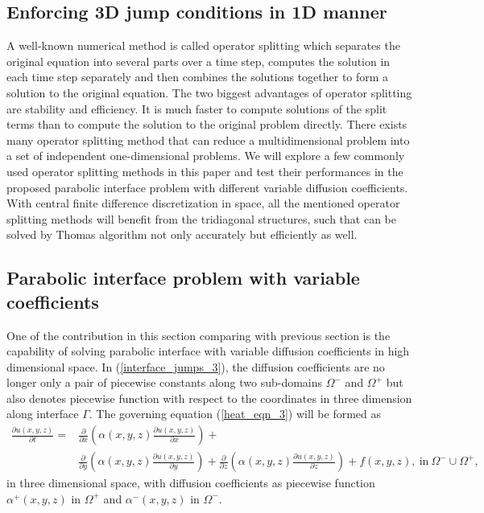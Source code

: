 \documentclass[dissertation]{uathesis}
\begin{document}
\begin{body}
\section{Enforcing 3D jump conditions in 1D manner}
%
A well-known numerical method is called operator splitting which separates the original equation into several parts over a time step, computes the solution in each time step separately and then combines the solutions together to form a solution to the original equation. The two biggest advantages of operator splitting are stability and efficiency. It is much faster to compute solutions of the split terms than to compute the solution to the original problem directly. There exists many operator splitting method that can reduce a multidimensional problem into a set of independent one-dimensional problems. We will explore a few commonly used operator splitting methods in this paper and test their performances in the proposed parabolic interface problem with different variable diffusion coefficients. With central finite difference discretization in space, all the mentioned operator splitting methods will benefit from the tridiagonal structures, such that can be solved by Thomas algorithm not only accurately but efficiently as well.  
%
\subsection{Parabolic interface problem with variable coefficients}
%
One of the contribution in this section comparing with previous section is the capability of solving parabolic interface with variable diffusion coefficients in high dimensional space. In (\ref{interface_jumps_3}), the diffusion coefficients are no longer only a pair of piecewise constants along two sub-domains $\Omega^{-}$ and $\Omega^{+}$ but also denotes piecewise function with respect to the coordinates in three dimension along interface $\Gamma$. The governing equation (\ref{heat_eqn_3}) will be formed as
%
\begin{align} \label{discretized_eqn_3}
\frac{\partial u(x, y, z)}{\partial t} = 
&\frac{\partial}{\partial x}(\alpha(x,y,z) \frac{\partial u(x, y, z)}{\partial x}) + \\
&\frac{\partial}{\partial y}(\alpha(x,y,z) \frac{\partial u(x, y, z)}{\partial y}) + 
\frac{\partial}{\partial z}(\alpha(x,y,z) \frac{\partial u(x, y, z)}{\partial z}) + f(x, y, z), 
~ \mbox{in} ~ \Omega^{-} \cup \Omega^{+}, \nonumber
\end{align}
%
in three dimensional space, with diffusion coefficients as piecewise function $\alpha^{+}(x, y, z)$ in $\Omega^{+}$ and $\alpha^{-}(x, y, z)$ in $\Omega^{-}$.
%	

\end{body}
\end{document}
